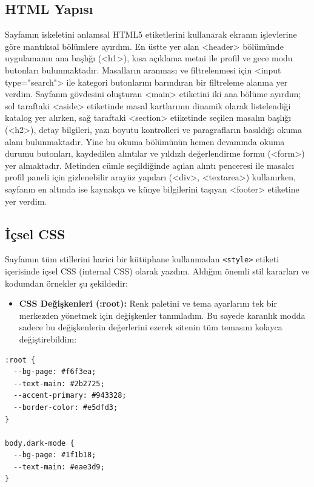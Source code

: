 \documentclass[12pt,a4paper]{article}
\begin{document}
\subsection{HTML Yapısı}
Sayfamın iskeletini anlamsal HTML5 etiketlerini kullanarak ekranın işlevlerine göre mantıksal bölümlere ayırdım. En üstte yer alan <header> bölümünde uygulamanın ana başlığı (<h1>), kısa açıklama metni ile profil ve gece modu butonları bulunmaktadır. Masalların aranması ve filtrelenmesi için <input type="search"> ile kategori butonlarını barındıran bir filtreleme alanına yer verdim. Sayfanın gövdesini oluşturan <main> etiketini iki ana bölüme ayırdım; sol taraftaki <aside> etiketinde masal kartlarının dinamik olarak listelendiği katalog yer alırken, sağ taraftaki <section> etiketinde seçilen masalın başlığı (<h2>), detay bilgileri, yazı boyutu kontrolleri ve paragrafların basıldığı okuma alanı bulunmaktadır. Yine bu okuma bölümünün hemen devamında okuma durumu butonları, kaydedilen alıntılar ve yıldızlı değerlendirme formu (<form>) yer almaktadır. Metinden cümle seçildiğinde açılan alıntı penceresi ile masalcı profil paneli için gizlenebilir arayüz yapıları (<div>, <textarea>) kullanırken, sayfanın en altında ise kaynakça ve künye bilgilerini taşıyan <footer> etiketine yer verdim.

\subsection{İçsel CSS}
Sayfamın tüm stillerini harici bir kütüphane kullanmadan \texttt{<style>} etiketi içerisinde içsel CSS (internal CSS) olarak yazdım. Aldığım önemli stil kararları ve kodumdan örnekler şu şekildedir:

\begin{itemize}
\item \textbf{CSS Değişkenleri (:root):} Renk paletini ve tema ayarlarını tek bir merkezden yönetmek için değişkenler tanımladım. Bu sayede karanlık modda sadece bu değişkenlerin değerlerini ezerek sitenin tüm temasını kolayca değiştirebildim:
\end{itemize}

\begin{lstlisting}[caption={CSS Değişkenleri ve Tema Ayarları}]
:root {
  --bg-page: #f6f3ea;
  --text-main: #2b2725;
  --accent-primary: #943328;
  --border-color: #e5dfd3;
}

body.dark-mode {
  --bg-page: #1f1b18;
  --text-main: #eae3d9;
}
\end{lstlisting}
\end{document}
